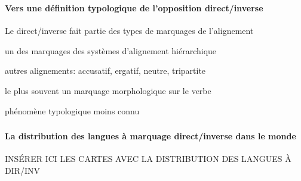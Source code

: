 \begin{frame}
\frametitle{}
\framesubtitle{Vers une définition typologique de l'opposition direct/inverse}
\begin{wideitemize}
\item Le direct/inverse fait partie des types de marquages de
  l'alignement
\begin{smallwideitemize}
\item un des marquages des systèmes d'alignement hiérarchique
\item autres alignements: accusatif, ergatif, neutre, tripartite
\item le plus souvent un marquage morphologique sur le verbe
\pause
\item phénomène typologique moins connu
\end{smallwideitemize}
\end{wideitemize}
\end{frame}


\begin{frame}
\frametitle{}
\framesubtitle{La distribution des langues à marquage direct/inverse
  dans le monde}
\begin{center}

INSÉRER ICI LES CARTES AVEC LA DISTRIBUTION DES LANGUES À DIR/INV

\end{center}
\end{frame}





